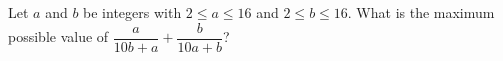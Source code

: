 Let $a$ and $b$ be integers with $2\le a\le16$ and $2\le b\le16$. What is the maximum possible value of $\dfrac{a}{10b+a}+\dfrac{b}{10a+b}$?
